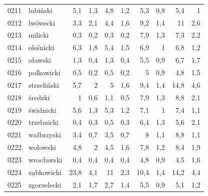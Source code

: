 \begin{center}
\begin{longtable}{lp{3cm}rrrrrrrr}
0211 & lubiński                & 5,1     & 1,3         & 4,8      & 1,2          & 5,3      & 0,8          & 5,4      & 1            \\
0212 & lwówecki                & 3,3     & 2,1         & 4,4      & 1,6          & 9,2      & 1,4          & 11       & 2,6          \\
0213 & milicki                 & 0,3     & 0,2         & 0,3      & 0,2          & 7,9      & 1,3          & 7,3      & 2,2          \\
0214 & oleśnicki               & 6,3     & 1,8         & 5,4      & 1,5          & 6,9      & 1            & 6,8      & 1,2          \\
0215 & oławski                 & 1,3     & 0,4         & 1,3      & 0,4          & 5,5      & 0,9          & 6,7      & 1,7          \\
0216 & polkowicki              & 0,5     & 0,2         & 0,5      & 0,2          & 5        & 0,9          & 4,8      & 1,5          \\
0217 & strzeliński             & 5,7     & 2           & 5        & 1,6          & 9,4      & 1,4          & 14,8     & 4,6          \\
0218 & średzki                 & 1       & 0,6         & 1,1      & 0,5          & 7,9      & 1,3          & 8,8      & 2,1          \\
0219 & świdnicki               & 5,6     & 1,3         & 5,3      & 1,2          & 7,1      & 1            & 7,4      & 1,1          \\
0220 & trzebnicki              & 0,4     & 0,3         & 0,5      & 0,3          & 6,4      & 1,3          & 5,6      & 2,1          \\
0221 & wałbrzyski              & 3,4     & 0,7         & 3,5      & 0,7          & 8        & 1,1          & 8,8      & 1,1          \\
0222 & wołowski                & 4,8     & 2           & 4,5      & 1,6          & 7,8      & 1,2          & 8,4      & 1,9          \\
0223 & wrocławski              & 0,4     & 0,4         & 0,4      & 0,4          & 4,8      & 0,9          & 4,5      & 1,6          \\
0224 & ząbkowicki              & 23,8    & 4,1         & 11       & 2,3          & 10,4     & 1,4          & 14,2     & 4,4          \\
0225 & zgorzelecki             & 2,1     & 1,7         & 2,7      & 1,4          & 5,5      & 0,9          & 5,1      & 1,2          \\

\end{longtable}
\end{center}

